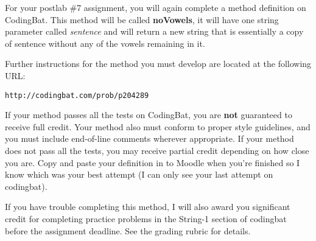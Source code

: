 For your postlab \#7 assignment, you will again complete a method definition on CodingBat. This method will be called \textbf{noVowels}, it will have one string parameter called \textit{sentence} and will return a new string that is essentially a copy of sentence without any of the vowels remaining in it.

Further instructions for the method you must develop are located at the following URL:

\begin{verbatim}
http://codingbat.com/prob/p204289
\end{verbatim}

If your method passes all the tests on CodingBat, you are \textbf{not} guaranteed to receive full credit. Your method also must conform to proper style guidelines, and you must include end-of-line comments wherever appropriate. If your method does not pass all the tests, you may receive partial credit depending on how close you are. Copy and paste your definition in to Moodle when you're finished so I know which was your best attempt (I can only see your last attempt on codingbat). 

If you have trouble completing this method, I will also award you significant credit for completing practice problems in the String-1 section of codingbat before the assignment deadline. See the grading rubric for details.

